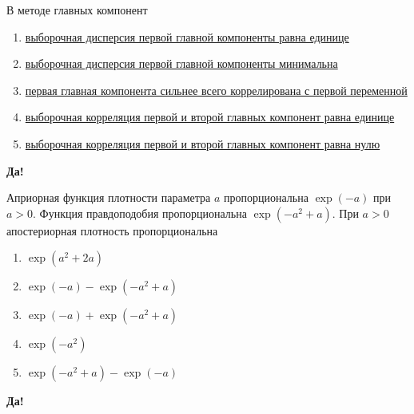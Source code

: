 \documentclass[t]{beamer}
\begin{document}
 \begin{frame} \label{11-Yes} 
\begin{block}{11} 

  В методе главных компонент


 \end{block} 
\begin{enumerate} 
\item[] \hyperlink{11-No}{\beamergotobutton{} выборочная дисперсия первой главной компоненты равна единице }
\item[] \hyperlink{11-No}{\beamergotobutton{} выборочная дисперсия первой главной компоненты минимальна}
\item[] \hyperlink{11-No}{\beamergotobutton{} первая главная компонента сильнее всего коррелирована с первой переменной}
\item[] \hyperlink{11-No}{\beamergotobutton{} выборочная корреляция первой и второй главных компонент равна единице}
\item[] \hyperlink{11-Yes}{\beamergotobutton{} выборочная корреляция первой и второй главных компонент равна нулю}
\end{enumerate} 

 \textbf{Да!} 
 \hyperlink{12}{}\end{frame} 


 \begin{frame} \label{12-Yes} 
\begin{block}{12} 

  Априорная функция плотности параметра $a$  пропорциональна $\exp(-a)$ при $a>0$. Функция правдоподобия пропорциональна $\exp(-a^2+a)$. При $a>0$ апостериорная плотность пропорциональна


 \end{block} 
\begin{enumerate} 
\item[] \hyperlink{12-No}{\beamergotobutton{} $\exp(a^2+2a)$}
\item[] \hyperlink{12-No}{\beamergotobutton{} $\exp(-a) - \exp(-a^2+a)$}
\item[] \hyperlink{12-No}{\beamergotobutton{} $\exp(-a) + \exp(-a^2+a)$}
\item[] \hyperlink{12-Yes}{\beamergotobutton{} $\exp(-a^2)$}
\item[] \hyperlink{12-No}{\beamergotobutton{} $\exp(-a^2+a) - \exp(-a)$}
\end{enumerate} 

 \textbf{Да!} 
 \hyperlink{13}{}\end{frame} 
\end{document}
